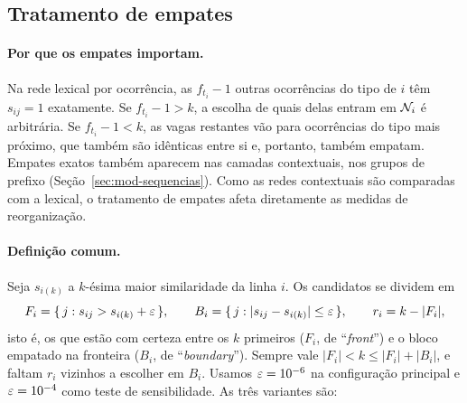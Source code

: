 \subsection{Tratamento de empates}\label{sec:red-empates}

\paragraph{Por que os empates importam.} Na rede lexical por ocorrência, as $f_{t_i}-1$ outras
ocorrências do tipo de $i$ têm $s_{ij}=1$ exatamente. Se $f_{t_i}-1>k$, a escolha de quais delas
entram em $\mathcal{N}_i$ é arbitrária. Se $f_{t_i}-1<k$, as vagas restantes vão para ocorrências do
tipo mais próximo, que também são idênticas entre si e, portanto, também empatam. Empates exatos
também aparecem nas camadas contextuais, nos grupos de prefixo (Seção~\ref{sec:mod-sequencias}).
Como as redes contextuais são comparadas com a lexical, o tratamento de empates afeta
diretamente as medidas de reorganização.

\paragraph{Definição comum.} Seja $s_{i(k)}$ a $k$-ésima maior similaridade da linha $i$. Os
candidatos se dividem em
\begin{equation}
    F_i = \{\,j : s_{ij} > s_{i(k)}+\varepsilon\,\},\qquad
    B_i = \{\,j : |s_{ij}-s_{i(k)}|\le\varepsilon\,\},\qquad
    r_i = k-|F_i|,
\end{equation}
isto é, os que estão com certeza entre os $k$ primeiros ($F_i$, de ``\emph{front}'') e o bloco
empatado na fronteira ($B_i$, de ``\emph{boundary}''). Sempre vale $|F_i|<k\le|F_i|+|B_i|$, e
faltam $r_i$ vizinhos a escolher em $B_i$. Usamos $\varepsilon=10^{-6}$ na configuração principal e
$\varepsilon=10^{-4}$ como teste de sensibilidade. As três variantes são:

